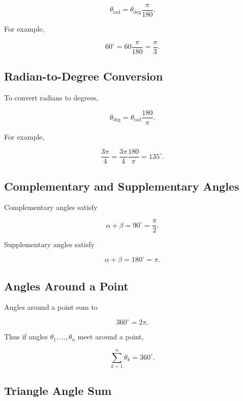 \[
\boxed{
\theta_{\mathrm{rad}}
=
\theta_{\mathrm{deg}}
\frac{\pi}{180}.
}
\]

For example,

\[
60^\circ
=
60
\frac{\pi}{180}
=
\boxed{
\frac{\pi}{3}.
}
\]

\subsection{Radian-to-Degree Conversion}
\label{subsec:radian-degree-conversion}

To convert radians to degrees,

\[
\boxed{
\theta_{\mathrm{deg}}
=
\theta_{\mathrm{rad}}
\frac{180}{\pi}.
}
\]

For example,

\[
\frac{3\pi}{4}
=
\frac{3\pi}{4}
\frac{180}{\pi}
=
\boxed{
135^\circ.
}
\]

\subsection{Complementary and Supplementary Angles}
\label{subsec:complementary-supplementary}

Complementary angles satisfy

\[
\boxed{
\alpha+\beta
=
90^\circ
=
\frac{\pi}{2}.
}
\]

Supplementary angles satisfy

\[
\boxed{
\alpha+\beta
=
180^\circ
=
\pi.
}
\]

\subsection{Angles Around a Point}
\label{subsec:angles-around-point}

Angles around a point sum to

\[
\boxed{
360^\circ
=
2\pi.
}
\]

Thus if angles \(\theta_1,\ldots,\theta_n\) meet around a point,

\[
\boxed{
\sum_{k=1}^{n}\theta_k
=
360^\circ.
}
\]

\subsection{Triangle Angle Sum}
\label{subsec:triangle-angle-sum}

